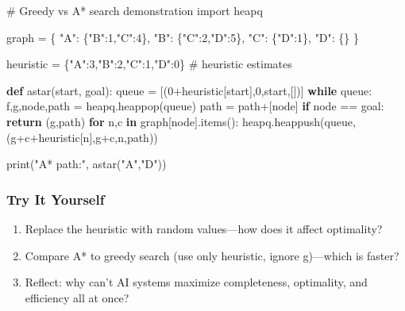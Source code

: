 \documentclass[
  letterpaper,
  DIV=11,
  numbers=noendperiod]{scrreprt}
\newenvironment{Shaded}{\begin{snugshade}}{\end{snugshade}}
\newcommand{\BuiltInTok}[1]{\textcolor[rgb]{0.00,0.23,0.31}{#1}}
\newcommand{\CommentTok}[1]{\textcolor[rgb]{0.37,0.37,0.37}{#1}}
\newcommand{\ControlFlowTok}[1]{\textcolor[rgb]{0.00,0.23,0.31}{\textbf{#1}}}
\newcommand{\DecValTok}[1]{\textcolor[rgb]{0.68,0.00,0.00}{#1}}
\newcommand{\ImportTok}[1]{\textcolor[rgb]{0.00,0.46,0.62}{#1}}
\newcommand{\KeywordTok}[1]{\textcolor[rgb]{0.00,0.23,0.31}{\textbf{#1}}}
\newcommand{\NormalTok}[1]{\textcolor[rgb]{0.00,0.23,0.31}{#1}}
\newcommand{\OperatorTok}[1]{\textcolor[rgb]{0.37,0.37,0.37}{#1}}
\newcommand{\StringTok}[1]{\textcolor[rgb]{0.13,0.47,0.30}{#1}}
\providecommand{\tightlist}{%
  \setlength{\itemsep}{0pt}\setlength{\parskip}{0pt}}
\begin{document}
\begin{Shaded}
\begin{Highlighting}[]
\CommentTok{\# Greedy vs A* search demonstration}
\ImportTok{import}\NormalTok{ heapq}

\NormalTok{graph }\OperatorTok{=}\NormalTok{ \{}
    \StringTok{"A"}\NormalTok{: \{}\StringTok{"B"}\NormalTok{:}\DecValTok{1}\NormalTok{,}\StringTok{"C"}\NormalTok{:}\DecValTok{4}\NormalTok{\},}
    \StringTok{"B"}\NormalTok{: \{}\StringTok{"C"}\NormalTok{:}\DecValTok{2}\NormalTok{,}\StringTok{"D"}\NormalTok{:}\DecValTok{5}\NormalTok{\},}
    \StringTok{"C"}\NormalTok{: \{}\StringTok{"D"}\NormalTok{:}\DecValTok{1}\NormalTok{\},}
    \StringTok{"D"}\NormalTok{: \{\}}
\NormalTok{\}}

\NormalTok{heuristic }\OperatorTok{=}\NormalTok{ \{}\StringTok{"A"}\NormalTok{:}\DecValTok{3}\NormalTok{,}\StringTok{"B"}\NormalTok{:}\DecValTok{2}\NormalTok{,}\StringTok{"C"}\NormalTok{:}\DecValTok{1}\NormalTok{,}\StringTok{"D"}\NormalTok{:}\DecValTok{0}\NormalTok{\}  }\CommentTok{\# heuristic estimates}

\KeywordTok{def}\NormalTok{ astar(start, goal):}
\NormalTok{    queue }\OperatorTok{=}\NormalTok{ [(}\DecValTok{0}\OperatorTok{+}\NormalTok{heuristic[start],}\DecValTok{0}\NormalTok{,start,[])]}
    \ControlFlowTok{while}\NormalTok{ queue:}
\NormalTok{        f,g,node,path }\OperatorTok{=}\NormalTok{ heapq.heappop(queue)}
\NormalTok{        path }\OperatorTok{=}\NormalTok{ path}\OperatorTok{+}\NormalTok{[node]}
        \ControlFlowTok{if}\NormalTok{ node }\OperatorTok{==}\NormalTok{ goal:}
            \ControlFlowTok{return}\NormalTok{ (g,path)}
        \ControlFlowTok{for}\NormalTok{ n,c }\KeywordTok{in}\NormalTok{ graph[node].items():}
\NormalTok{            heapq.heappush(queue,(g}\OperatorTok{+}\NormalTok{c}\OperatorTok{+}\NormalTok{heuristic[n],g}\OperatorTok{+}\NormalTok{c,n,path))}

\BuiltInTok{print}\NormalTok{(}\StringTok{"A* path:"}\NormalTok{, astar(}\StringTok{"A"}\NormalTok{,}\StringTok{"D"}\NormalTok{))}
\end{Highlighting}
\end{Shaded}

\subsubsection{Try It Yourself}\label{try-it-yourself-63}

\begin{enumerate}
\def\labelenumi{\arabic{enumi}.}
\tightlist
\item
  Replace the heuristic with random values---how does it affect
  optimality?
\item
  Compare A* to greedy search (use only heuristic, ignore g)---which is
  faster?
\item
  Reflect: why can't AI systems maximize completeness, optimality, and
  efficiency all at once?
\end{enumerate}
\end{document}
